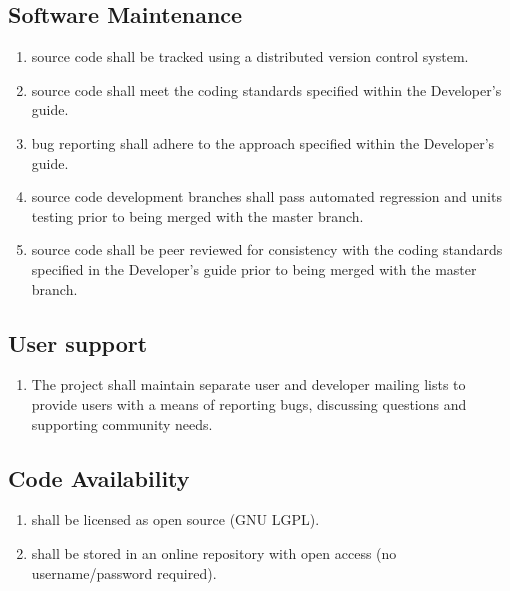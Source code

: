 \subsection{Software Maintenance}
\begin{enumerate}[resume]
	\item \label{versionControl} \pft source code shall be tracked using a distributed version control system.
	\item \label{codeStandard} \pft source code shall meet the coding standards specified within the \pft Developer’s guide. 
	\item \label{reportBugs} \pft bug reporting shall adhere to the approach specified within the \pft Developer’s guide. 
	\item \label{autTesting} \pft source code development branches shall pass automated regression and units testing prior to being merged with the master branch.
	\item \label{codeReview} \pft source code shall be peer reviewed for consistency with the coding standards specified in the \pft Developer's guide prior to being merged with the master branch.
\end{enumerate}

\subsection{User support}
\begin{enumerate}[resume]
	\item \label{userSupport} The \pft project shall maintain separate user and developer mailing lists to provide users with a means of reporting bugs, discussing questions and supporting community needs.
\end{enumerate}

\subsection{Code Availability}
\begin{enumerate}[resume]
	\item \label{codeLicensing} \pft shall be licensed as open source (GNU LGPL).
	\item \label{codeAvailability} \pft shall be stored in an online repository with open access (no username/password required).
\end{enumerate}




















